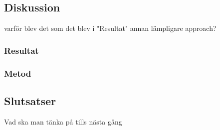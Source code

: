 	
	\subsection{Diskussion}
	varför blev det som det blev i "Resultat"
	annan lämpligare approach?
	
	
	\subsubsection{Resultat}
	
	\subsubsection{Metod}
	\subsection{Slutsatser}
	Vad ska man tänka på tills nästa gång